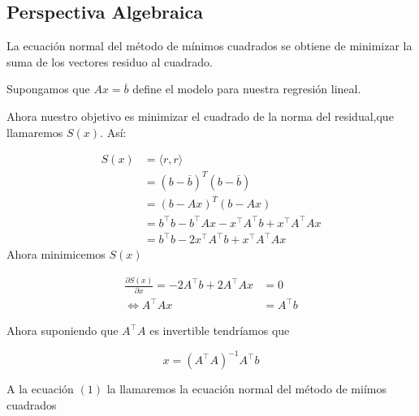 \documentclass[12pt]{article}
\begin{document}
\vspace{0.5cm}


 
\vspace{6.5cm}
 




\begin{center}    
\section{Perspectiva Algebraica}
\end{center}

 La ecuaci\'on normal del método de mínimos cuadrados se obtiene de minimizar la suma de los vectores residuo al cuadrado.

 Supongamos que $Ax=\overline{b}$ define el modelo para nuestra regresi\'on lineal.

 Ahora nuestro objetivo es minimizar el cuadrado de la norma del residual,que  llamaremos  $S(x)$. Así:

 \begin{align*}
     S(x)&=\langle r,r\rangle\\
     &=(b-\overline{b})^T(b-\overline{b})\\
     &=(b-Ax)^T(b-Ax)\\  
     &=b^\top b - b^\top Ax - x^\top A^\top b + x^\top A^\top A x\\
     &=b^\top b - 2 x^\top A^\top b + x^\top A^\top A x
 \end{align*}
Ahora minimicemos $S(x)$

\begin{align*}
    \frac{\partial S(x)}{\partial x} = -2A^\top b + 2A^\top Ax&=0\\
  \iff  A^\top Ax& = A^\top b
\end{align*}

Ahora suponiendo que $A^\top A$ es invertible tendr\'iamos que

\begin{equation}
    x =(A^\top A)^{-1} A^\top b
\end{equation}
 
A la ecuaci\'on $(1)$ la llamaremos la ecuaci\'on normal del m\'etodo de mi\'imos cuadrados
\end{document}
